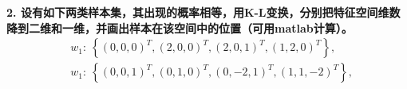 \documentclass[a4paper, UTF8, 12pt]{ctexart}
\begin{document}
    \newpage
    \textbf{2. 设有如下两类样本集，其出现的概率相等，用K-L变换，分别把特征空间维数降到二维和一维，并画出样本在该空间中的位置（可用matlab计算）。}
    \begin{equation*}
        \begin{split}
            &w_1: \ \left\{ {\left(0,0,0 \right)}^T, {\left(2,0,0 \right)}^T, {\left(2,0,1\right)}^T, {\left(1,2,0\right)}^T \right\}, \\
            &w_1: \ \left\{ {\left(0,0,1 \right)}^T, {\left(0,1,0 \right)}^T, {\left(0,-2,1\right)}^T, {\left(1,1,-2\right)}^T \right\}, \\
        \end{split}
    \end{equation*}
\end{document}
